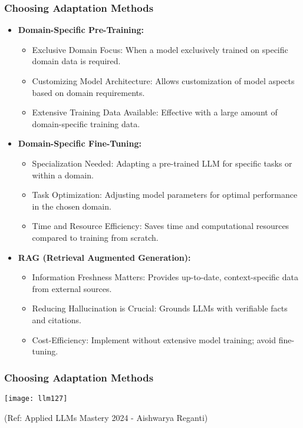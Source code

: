 \begin{frame}[fragile]\frametitle{Choosing Adaptation Methods}
  \begin{itemize}
    \item \textbf{Domain-Specific Pre-Training:}
      \begin{itemize}
        \item Exclusive Domain Focus: When a model exclusively trained on specific domain data is required.
        \item Customizing Model Architecture: Allows customization of model aspects based on domain requirements.
        \item Extensive Training Data Available: Effective with a large amount of domain-specific training data.
      \end{itemize}
    \item \textbf{Domain-Specific Fine-Tuning:}
      \begin{itemize}
        \item Specialization Needed: Adapting a pre-trained LLM for specific tasks or within a domain.
        \item Task Optimization: Adjusting model parameters for optimal performance in the chosen domain.
        \item Time and Resource Efficiency: Saves time and computational resources compared to training from scratch.
      \end{itemize}
    \item \textbf{RAG (Retrieval Augmented Generation):}
      \begin{itemize}
        \item Information Freshness Matters: Provides up-to-date, context-specific data from external sources.
        \item Reducing Hallucination is Crucial: Grounds LLMs with verifiable facts and citations.
        \item Cost-Efficiency: Implement without extensive model training; avoid fine-tuning.
      \end{itemize}
  \end{itemize}
\end{frame}

\begin{frame}[fragile]\frametitle{Choosing Adaptation Methods}

\begin{center}
\texttt{[image: llm127]}
\end{center}				

{\tiny (Ref: Applied LLMs Mastery 2024 - Aishwarya Reganti)}

\end{frame}